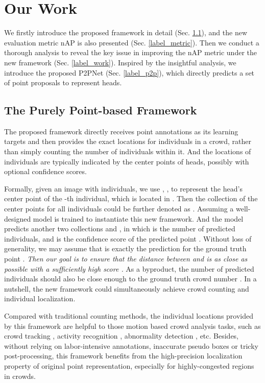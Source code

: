 \documentclass[10pt,twocolumn,letterpaper]{article}
\begin{document}
\section{Our Work}
We firstly introduce the proposed framework in detail (Sec. \ref{label_task}), and the new evaluation metric nAP is also presented (Sec. \ref{label_metric}). Then we conduct a thorough analysis to reveal the key issue in improving the nAP metric under the new framework (Sec. \ref{label_work}). Inspired by the insightful analysis, we introduce the proposed P2PNet (Sec. \ref{label_p2p}), which directly predicts a set of point proposals to represent heads.\subsection{The Purely Point-based Framework}\label{label_task}
The proposed framework directly receives point annotations as its learning targets and then provides the exact locations for individuals in a crowd, rather than simply counting the number of individuals within it. And the locations of individuals are typically indicated by the center points of heads, possibly with optional confidence scores. 

Formally, given an image with  individuals, we use , , to represent the head's center point of the -th individual, which is located in . Then the collection of the center points for all individuals could be further denoted as . Assuming a well-designed model  is trained to instantiate this new framework. And the model  predicts another two collections  and , in which  is the number of predicted individuals, and  is the confidence score of the predicted point . Without loss of generality, we may assume that  is exactly the prediction for the ground truth point . \textit{Then our goal is to ensure that the distance between  and  is as close as possible with a sufficiently high score .} As a byproduct, the number of predicted individuals  should also be close enough to the ground truth crowd number . In a nutshell, the new framework could simultaneously achieve crowd counting and individual localization.

Compared with traditional counting methods, the individual locations provided by this framework are helpful to those motion based crowd analysis tasks, such as crowd tracking \cite{zhu2016crowd}, activity recognition \cite{dupont2017crowd}, abnormality detection \cite{chen2019detecting}, etc. Besides, without relying on labor-intensive annotations, inaccurate pseudo boxes or tricky post-processing, this framework benefits from the high-precision localization property of original point representation, especially for highly-congested regions in crowds.
\end{document}

